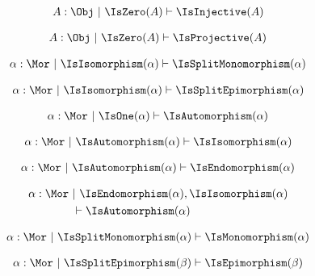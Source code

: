 \begin{sequent}
\begin{align*}
  A:\Obj ~|~ \IsZero( A ) \vdash \IsInjective( A )
\end{align*}
\end{sequent}

\begin{sequent}
\begin{align*}
  A:\Obj ~|~ \IsZero( A ) \vdash \IsProjective( A )
\end{align*}
\end{sequent}

\begin{sequent}
\begin{align*}
  \alpha:\Mor ~|~ \IsIsomorphism( \alpha ) \vdash \IsSplitMonomorphism( \alpha )
\end{align*}
\end{sequent}

\begin{sequent}
\begin{align*}
  \alpha:\Mor ~|~ \IsIsomorphism( \alpha ) \vdash \IsSplitEpimorphism( \alpha )
\end{align*}
\end{sequent}

\begin{sequent}
\begin{align*}
  \alpha:\Mor ~|~ \IsOne( \alpha ) \vdash \IsAutomorphism( \alpha )
\end{align*}
\end{sequent}

\begin{sequent}
\begin{align*}
  \alpha:\Mor ~|~ \IsAutomorphism( \alpha ) \vdash \IsIsomorphism( \alpha )
\end{align*}
\end{sequent}

\begin{sequent}
\begin{align*}
  \alpha:\Mor ~|~ \IsAutomorphism( \alpha ) \vdash \IsEndomorphism( \alpha )
\end{align*}
\end{sequent}

\begin{sequent}
\begin{align*}
  \alpha:\Mor ~&|~  \IsEndomorphism( \alpha ), \IsIsomorphism( \alpha ) \\ 
  &\vdash \IsAutomorphism( \alpha )
\end{align*}
\end{sequent}

\begin{sequent}
\begin{align*}
  \alpha:\Mor ~|~ \IsSplitMonomorphism( \alpha ) \vdash \IsMonomorphism( \alpha )
\end{align*}
\end{sequent}

\begin{sequent}
\begin{align*}
  \alpha:\Mor ~|~ \IsSplitEpimorphism( \beta ) \vdash \IsEpimorphism( \beta )
\end{align*}
\end{sequent}